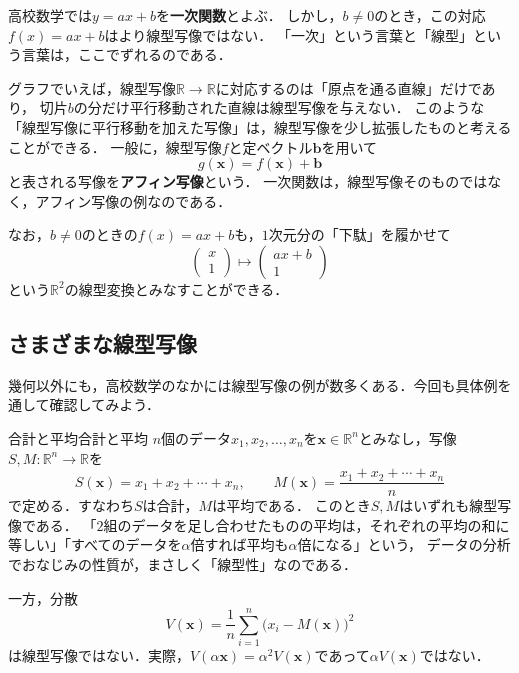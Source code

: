 \begin{mycolumn}
  高校数学では$y = ax + b$を\textbf{一次関数}とよぶ．
  しかし，$b \ne 0$のとき，この対応$f(x) = ax + b$はより線型写像ではない．
  「一次」という言葉と「線型」という言葉は，ここでずれるのである．

  グラフでいえば，線型写像$\mathbb{R} \to \mathbb{R}$に対応するのは「原点を通る直線」だけであり，
  切片$b$の分だけ平行移動された直線は線型写像を与えない．
  このような「線型写像に平行移動を加えた写像」は，線型写像を少し拡張したものと考えることができる．
  一般に，線型写像$f$と定ベクトル$\bm{b}$を用いて
  \[
    g(\bm{x}) = f(\bm{x}) + \bm{b}
  \]
  と表される写像を\textbf{アフィン写像}という．
  一次関数は，線型写像そのものではなく，アフィン写像の例なのである．

  なお，$b \ne 0$のときの$f(x) = ax + b$も，$1$次元分の「下駄」を履かせて
  \[
    \begin{pmatrix} x \\ 1 \end{pmatrix}
    \longmapsto
    \begin{pmatrix} ax + b \\ 1 \end{pmatrix}
  \]
  という$\mathbb{R}^2$の線型変換とみなすことができる．
\end{mycolumn}

\subsection{さまざまな線型写像}

幾何以外にも，高校数学のなかには線型写像の例が数多くある．今回も具体例を通して確認してみよう．

\begin{example}{合計と平均}{合計と平均}
  $n$個のデータ$x_1, x_2, \dots, x_n$を$\bm{x} \in \mathbb{R}^n$とみなし，写像$S, M \colon \mathbb{R}^n \to \mathbb{R}$を
  \[
    S(\bm{x}) = x_1 + x_2 + \cdots + x_n, \qquad
    M(\bm{x}) = \frac{x_1 + x_2 + \cdots + x_n}{n}
  \]
  で定める．すなわち$S$は合計，$M$は平均である．
  このとき$S,M$はいずれも線型写像である．
  「$2$組のデータを足し合わせたものの平均は，それぞれの平均の和に等しい」「すべてのデータを$\alpha$倍すれば平均も$\alpha$倍になる」という，
  データの分析でおなじみの性質が，まさしく「線型性」なのである．

  一方，分散
  \[
    V(\bm{x}) = \frac{1}{n}\sum_{i=1}^{n} \bigl(x_i - M(\bm{x})\bigr)^2
  \]
  は線型写像ではない．実際，$V(\alpha\bm{x}) = \alpha^2 V(\bm{x})$であって$\alpha V(\bm{x})$ではない．
\end{example}


